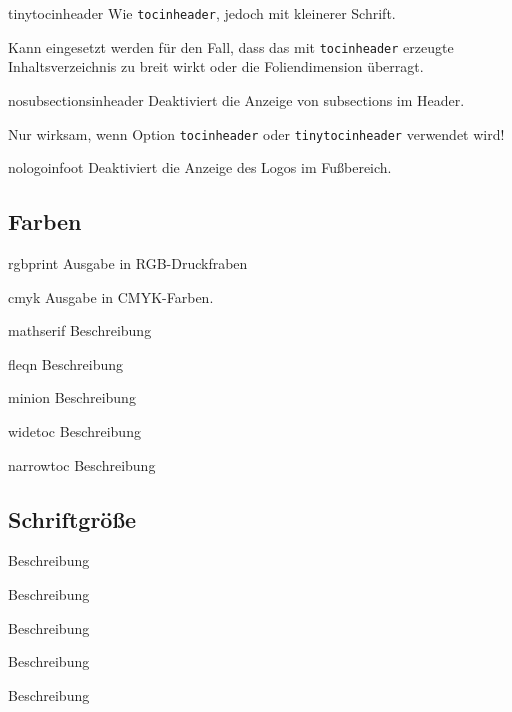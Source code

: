 \documentclass[a4paper,colorscheme=green,TUBStitlepage=picture]{tubsreprt}
\begin{document}
\begin{classoption}{tinytocinheader}
  Wie \lstinline{tocinheader}, jedoch mit kleinerer Schrift.

  Kann eingesetzt werden für den Fall, dass das mit \lstinline{tocinheader}
  erzeugte Inhaltsverzeichnis zu breit wirkt oder die Foliendimension
  überragt.
\end{classoption}

\begin{classoption}{nosubsectionsinheader}
  Deaktiviert die Anzeige von subsections im Header.
  
  Nur wirksam, wenn Option \lstinline{tocinheader} oder
  \lstinline{tinytocinheader} verwendet wird!
\end{classoption}

\begin{classoption}{nologoinfoot}
  Deaktiviert die Anzeige des Logos im Fußbereich.
\end{classoption}

\subsection{Farben}

\begin{classoption}{rgbprint}
  Ausgabe in RGB-Druckfraben
\end{classoption}

\begin{classoption}{cmyk}
  Ausgabe in CMYK-Farben.
\end{classoption}


\begin{classoption}{mathserif}
  Beschreibung
\end{classoption}

\begin{classoption}{fleqn}
  Beschreibung
\end{classoption}

\begin{classoption}{minion}
  Beschreibung
\end{classoption}

\begin{classoption}{widetoc}
  Beschreibung
\end{classoption}

\begin{classoption}{narrowtoc}
  Beschreibung
\end{classoption}

\subsection{Schriftgröße}

\begin{classoption}{9pt}
  Beschreibung
\end{classoption}

\begin{classoption}{10pt}
  Beschreibung
\end{classoption}

\begin{classoption}{11pt}
  Beschreibung
\end{classoption}

\begin{classoption}{12pt}
  Beschreibung
\end{classoption}

\begin{classoption}{14pt}
  Beschreibung
\end{classoption}
\end{document}
